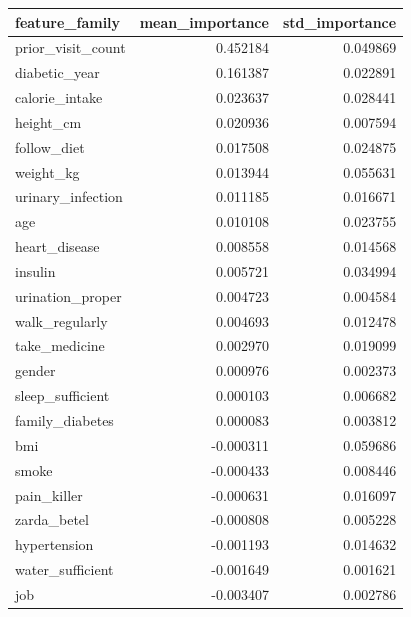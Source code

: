 \begin{tabular}{lrr}
\toprule
feature\_family & mean\_importance & std\_importance \\
\midrule
prior\_visit\_count & 0.452184 & 0.049869 \\
diabetic\_year & 0.161387 & 0.022891 \\
calorie\_intake & 0.023637 & 0.028441 \\
height\_cm & 0.020936 & 0.007594 \\
follow\_diet & 0.017508 & 0.024875 \\
weight\_kg & 0.013944 & 0.055631 \\
urinary\_infection & 0.011185 & 0.016671 \\
age & 0.010108 & 0.023755 \\
heart\_disease & 0.008558 & 0.014568 \\
insulin & 0.005721 & 0.034994 \\
urination\_proper & 0.004723 & 0.004584 \\
walk\_regularly & 0.004693 & 0.012478 \\
take\_medicine & 0.002970 & 0.019099 \\
gender & 0.000976 & 0.002373 \\
sleep\_sufficient & 0.000103 & 0.006682 \\
family\_diabetes & 0.000083 & 0.003812 \\
bmi & -0.000311 & 0.059686 \\
smoke & -0.000433 & 0.008446 \\
pain\_killer & -0.000631 & 0.016097 \\
zarda\_betel & -0.000808 & 0.005228 \\
hypertension & -0.001193 & 0.014632 \\
water\_sufficient & -0.001649 & 0.001621 \\
job & -0.003407 & 0.002786 \\
\bottomrule
\end{tabular}
